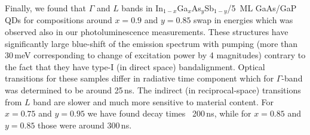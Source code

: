 Finally, we found that $\Gamma$ and $L$ bands in In$_{1-x}$Ga$_x$As$_y$Sb$_{1-y}$/5~ML GaAs/GaP QDs for compositions around $x=0.9$ and $y=0.85$ swap in energies which was observed also in our photoluminescence measurements. These structures have significantly large blue-shift of the emission spectrum with pumping (more than 30$\,$meV corresponding to change of excitation power by 4 magnitudes) contrary to the fact that they have type-I (in direct space) bandalignment. Optical transitions for these samples differ in radiative time component which for $\Gamma$-band was determined to be around 25$\,$ns. The indirect (in reciprocal-space) transitions from $L$ band are slower and much more sensitive to material content. For $x=0.75$ and $y=0.95$ we have found decay times ~200$\,$ns, while for $x=0.85$ and $y=0.85$ those were around 300$\,$ns.


\newpage

\newpage 